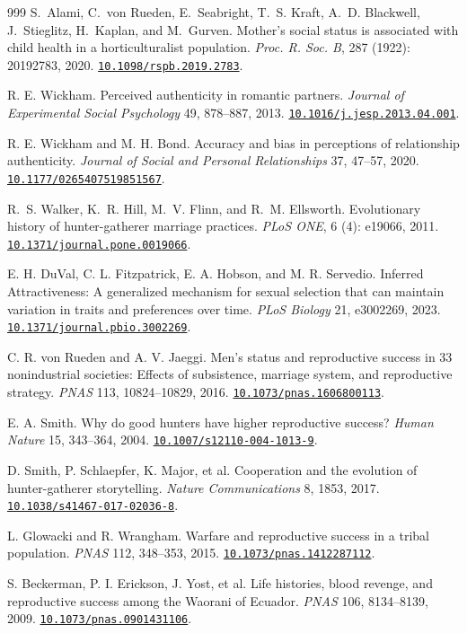 \documentclass[10pt,twocolumn,letterpaper]{article}
\newcommand{\doi}[1]{\href{https://doi.org/#1}{\nolinkurl{#1}}}
\begin{document}
\begin{thebibliography}{999}
 S.~{Alami}, C.~{von Rueden}, E.~{Seabright}, T.~S. {Kraft}, A.~D. {Blackwell}, J.~{Stieglitz}, H.~{Kaplan}, and M.~{Gurven}. {Mother's social status is associated with child health in a horticulturalist population}. \emph{Proc. R. Soc. B}, 287 (1922): 20192783, 2020. \doi{10.1098/rspb.2019.2783}.

 R. E. Wickham. Perceived authenticity in romantic partners. \emph{Journal of Experimental Social Psychology} 49, 878--887, 2013. \doi{10.1016/j.jesp.2013.04.001}.

 R. E. Wickham and M. H. Bond. Accuracy and bias in perceptions of relationship authenticity. \emph{Journal of Social and Personal Relationships} 37, 47--57, 2020. \doi{10.1177/0265407519851567}.

 R.~S. {Walker}, K.~R. {Hill}, M.~V. {Flinn}, and R.~M. {Ellsworth}. {Evolutionary history of hunter-gatherer marriage practices}. \emph{PLoS ONE}, 6 (4): e19066, 2011. \doi{10.1371/journal.pone.0019066}.

 E. H. DuVal, C. L. Fitzpatrick, E. A. Hobson, and M. R. Servedio. Inferred Attractiveness: A generalized mechanism for sexual selection that can maintain variation in traits and preferences over time. \emph{PLoS Biology} 21, e3002269, 2023. \doi{10.1371/journal.pbio.3002269}.

 C. R. von Rueden and A. V. Jaeggi. Men's status and reproductive success in 33 nonindustrial societies: Effects of subsistence, marriage system, and reproductive strategy. \emph{PNAS} 113, 10824--10829, 2016. \doi{10.1073/pnas.1606800113}.

 E. A. Smith. Why do good hunters have higher reproductive success? \emph{Human Nature} 15, 343--364, 2004. \doi{10.1007/s12110-004-1013-9}.

 D. Smith, P. Schlaepfer, K. Major, et al. Cooperation and the evolution of hunter-gatherer storytelling. \emph{Nature Communications} 8, 1853, 2017. \doi{10.1038/s41467-017-02036-8}.

 L. Glowacki and R. Wrangham. Warfare and reproductive success in a tribal population. \emph{PNAS} 112, 348--353, 2015. \doi{10.1073/pnas.1412287112}.

 S. Beckerman, P. I. Erickson, J. Yost, et al. Life histories, blood revenge, and reproductive success among the Waorani of Ecuador. \emph{PNAS} 106, 8134--8139, 2009. \doi{10.1073/pnas.0901431106}.


\end{thebibliography}
\end{document}
